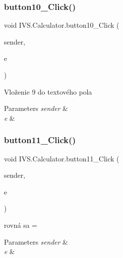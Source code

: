\subsubsection{\texorpdfstring{button10\+\_\+\+Click()}{button10\_Click()}}
{\footnotesize\ttfamily void I\+V\+S.\+Calculator.\+button10\+\_\+\+Click (\begin{DoxyParamCaption}\item[{object}]{sender,  }\item[{Event\+Args}]{e }\end{DoxyParamCaption})\hspace{0.3cm}{\ttfamily [protected]}}



Vloženie \textquotesingle{}9\textquotesingle{} do textového pola 


\begin{DoxyParams}{Parameters}
{\em sender} & \\
\hline
{\em e} & \\
\hline
\end{DoxyParams}
\mbox{\label{class_i_v_s_1_1_calculator_af183a6b7dd102cfeceb0bff1495e9a0e}} 
\subsubsection{\texorpdfstring{button11\+\_\+\+Click()}{button11\_Click()}}
{\footnotesize\ttfamily void I\+V\+S.\+Calculator.\+button11\+\_\+\+Click (\begin{DoxyParamCaption}\item[{object}]{sender,  }\item[{Event\+Args}]{e }\end{DoxyParamCaption})\hspace{0.3cm}{\ttfamily [protected]}}



rovná sa = 


\begin{DoxyParams}{Parameters}
{\em sender} & \\
\hline
{\em e} & \\
\hline
\end{DoxyParams}
\mbox{\label{class_i_v_s_1_1_calculator_a654a46c56d62a6b2b11bdf8b729f5102}} 
